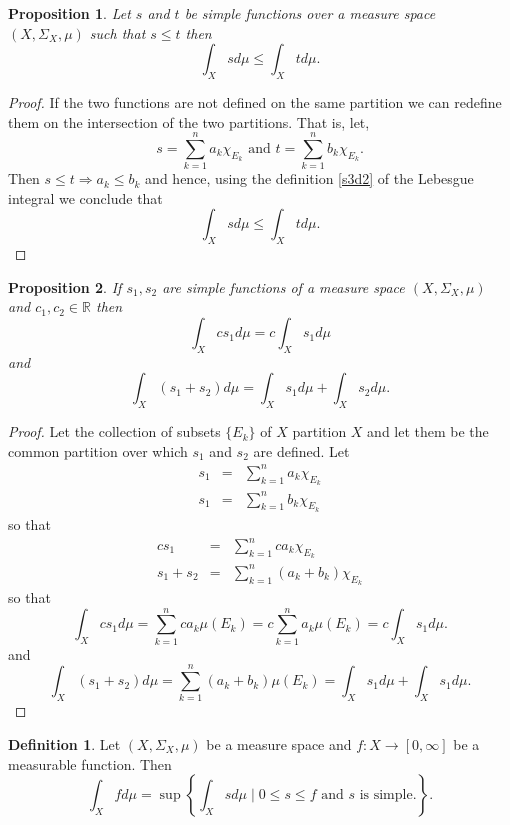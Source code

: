 \documentclass{article}
\newcommand{\sor}{\mathbb{R}}
\theoremstyle{plain}
\numberwithin{thm}{section}
\theoremstyle{plain}
\newtheorem{prop}{Proposition}
\numberwithin{prop}{section}
\theoremstyle{definition}
\newtheorem{defn}{Definition}
\numberwithin{defn}{section}
\theoremstyle{remark}
\numberwithin{equation}{section}
\begin{document}
\begin{prop}\label{s3p4}
Let $s$ and $ t$ be simple functions over a measure space $(X, \Sigma_X, \mu)$
such that $s \le  t$ then
\[
\int_Xs d\mu \le \int_X t d\mu.
\]
\end{prop}
\begin{proof}
If the two functions are not defined on the same partition we can redefine them
on the intersection of the two partitions. That is, let,
\[
s = \sum_{k=1}^n a_k\chi_{E_k} \text{ and }  t = \sum_{k=1}^n b_k\chi_{E_k}.
\]
Then $s \le  t \Rightarrow a_k \le b_k$ and hence, using the definition
\ref{s3d2} of the Lebesgue integral we conclude that
\[
\int_Xs d\mu \le \int_X t d\mu.
\]
\end{proof}

\begin{prop}\label{s3p5}
If $s_1, s_2$ are simple functions of a measure space $(X, \Sigma_X, \mu)$
and $c_1, c_2 \in \sor$ then
\[
\int_X cs_1 d\mu = c\int_Xs_1 d\mu
\]
and
\[
\int_X(s_1 + s_2)d\mu = \int_Xs_1 d\mu + \int_Xs_2 d\mu.
\]
\end{prop}
\begin{proof}
Let the collection of subsets $\{E_k\}$ of $X$ partition $X$ and let them be the
common partition over which $s_1$ and $s_2$ are defined. Let
\begin{eqnarray*}
s_1 &=& \sum_{k=1}^na_k\chi_{E_k} \\
s_1 &=& \sum_{k=1}^nb_k\chi_{E_k} 
\end{eqnarray*}
so that
\begin{eqnarray*}
cs_1 &=& \sum_{k=1}^n ca_k\chi_{E_k} \\
s_1 + s_2 &=& \sum_{k=1}^n(a_k + b_k)\chi_{E_k}
\end{eqnarray*}
so that
\[
\int_X cs_1 d\mu = \sum_{k=1}^n ca_k\mu(E_k) = c\sum_{k=1}^na_k\mu(E_k)
= c\int_Xs_1 d\mu.
\]
and
\[
\int_X(s_1 + s_2)d\mu = \sum_{k=1}^n(a_k + b_k)\mu(E_k) = 
\int_Xs_1 d\mu + \int_Xs_1 d\mu.
\]
\end{proof}

\begin{defn}
Let $(X, \Sigma_X, \mu)$ be a measure space and $f:X \rightarrow [0, \infty]$ be
a measurable function. Then
\[
\int_X f d\mu = 
\sup\left\{\int_X sd\mu \;|\; 0 \le s \le f \text{ and } s \text{ is simple.}\right\}.
\]
\end{defn}
\end{document}
